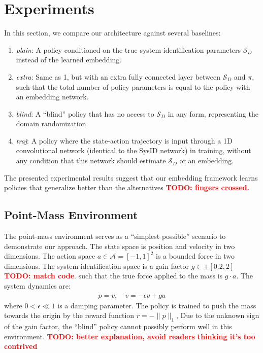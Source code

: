 \documentclass{article}
\newcommand{\TODO}[1]{\textcolor{red}{\textbf{TODO: #1}}}
\newcommand{\cA}{\mathcal{A}}
\newcommand{\cS}{\mathcal{S}}
\newcommand{\blind}{\emph{blind}}
\newcommand{\plain}{\emph{plain}}
\newcommand{\extra}{\emph{extra}}
\newcommand{\traj}{\emph{traj}}
\begin{document}
\section{Experiments}
In this section, we compare our architecture against several baselines:
\begin{enumerate}
\item \plain: A policy conditioned on the true system identification parameters $\cS_D$ instead of the learned embedding.
\item \extra: Same as 1, but with an extra fully connected layer between $\cS_D$ and $\pi$, such that the total number of policy parameters is equal to the policy with an embedding network.
\item \blind: A ``blind'' policy that has no access to $\cS_D$ in any form, representing the domain randomization.
\item \traj: A policy where the state-action trajectory is input through a 1D convolutional network (identical to the SysID network) in training, without any condition that this network should estimate $\cS_D$ or an embedding.
\end{enumerate}
The presented experimental results suggest that our embedding framework learns policies that generalize better than the alternatives \TODO{fingers crossed.}

\subsection{Point-Mass Environment}
The point-mass environment serves as a ``simplest possible'' scenario to demonstrate our approach.
The state space is position and velocity in two dimensions.
The action space $a \in \cA = [-1, 1]^2$ is a bounded force in two dimensions.
The system identification space is a gain factor $g \in \pm[0.2, 2]$ \TODO{match code}.
such that the true force applied to the mass is $g \cdot a$.
The system dynamics are:
\begin{equation}\begin{split}
\dot p = v, \quad \dot v = -\epsilon v + ga
\end{split}\end{equation}
where $0 < \epsilon \ll 1$ is a damping parameter.
The policy is trained to push the mass towards the origin
by the reward function $r = -\|p\|_1$,
Due to the unknown sign of the gain factor, the ``blind'' policy cannot possibly perform well in this environment.
\TODO{better explanation, avoid readers thinking it's too contrived}
\end{document}

